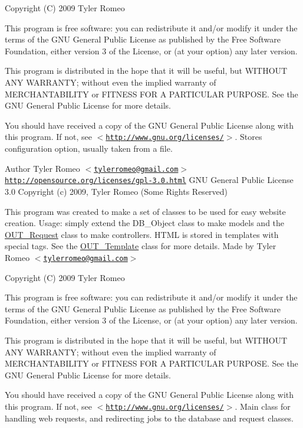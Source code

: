 Copyright (C) 2009 Tyler Romeo

This program is free software: you can redistribute it and/or modify it under the terms of the GNU General Public License as published by the Free Software Foundation, either version 3 of the License, or (at your option) any later version.

This program is distributed in the hope that it will be useful, but WITHOUT ANY WARRANTY; without even the implied warranty of MERCHANTABILITY or FITNESS FOR A PARTICULAR PURPOSE. See the GNU General Public License for more details.

You should have received a copy of the GNU General Public License along with this program. If not, see $<$\href{http://www.gnu.org/licenses/}{\tt http://www.gnu.org/licenses/}$>$. Stores configuration option, usually taken from a file.

\begin{DoxyAuthor}{Author}
Tyler Romeo $<$\href{mailto:tylerromeo@gmail.com}{\tt tylerromeo@gmail.com}$>$  \href{http://opensource.org/licenses/gpl-3.0.html}{\tt http://opensource.org/licenses/gpl-\/3.0.html} GNU General Public License 3.0  Copyright (c) 2009, Tyler Romeo (Some Rights Reserved)
\end{DoxyAuthor}
This program was created to make a set of classes to be used for easy website creation. Usage: simply extend the DB\_\-Object class to make models and the \hyperlink{classOUT__Request}{OUT\_\-Request} class to make controllers. HTML is stored in templates with special tags. See the \hyperlink{classOUT__Template}{OUT\_\-Template} class for more details. Made by Tyler Romeo $<$\href{mailto:tylerromeo@gmail.com}{\tt tylerromeo@gmail.com}$>$

Copyright (C) 2009 Tyler Romeo

This program is free software: you can redistribute it and/or modify it under the terms of the GNU General Public License as published by the Free Software Foundation, either version 3 of the License, or (at your option) any later version.

This program is distributed in the hope that it will be useful, but WITHOUT ANY WARRANTY; without even the implied warranty of MERCHANTABILITY or FITNESS FOR A PARTICULAR PURPOSE. See the GNU General Public License for more details.

You should have received a copy of the GNU General Public License along with this program. If not, see $<$\href{http://www.gnu.org/licenses/}{\tt http://www.gnu.org/licenses/}$>$. Main class for handling web requests, and redirecting jobs to the database and request classes.

